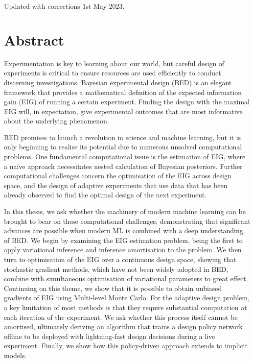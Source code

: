 \documentclass[a4paper, 10pt]{report}
\theoremstyle{plain}
\begin{document}
	
	
	
	\newpage
	Updated with corrections 1st May 2023.
	
	\newpage
	\chapter*{Abstract}
	Experimentation is key to learning about our world, but careful design of experiments is critical to ensure resources are used efficiently to conduct discerning investigations. Bayesian experimental design (BED) is an elegant framework that provides a mathematical definition of the expected information gain (EIG) of running a certain experiment. Finding the design with the maximal EIG will, in expectation, give experimental outcomes that are most informative about the underlying phenomenon.
	
	BED promises to launch a revolution in science and machine learning, but it is only beginning to realise its potential due to numerous unsolved computational problems. One fundamental computational issue is the estimation of EIG, where a naïve approach necessitates nested calculation of Bayesian posteriors. Further computational challenges concern the optimisation of the EIG across design space, and the design of adaptive experiments that use data that has been already observed to find the optimal design of the next experiment.
	
	In this thesis, we ask whether the machinery of modern machine learning can be brought to bear on these computational challenges, demonstrating that significant advances are possible when modern ML is combined with a deep understanding of BED. We begin by examining the EIG estimation problem, being the first to apply variational inference and inference amortisation to the problem. We then turn to optimisation of the EIG over a continuous design space, showing that stochastic gradient methods, which have not been widely adopted in BED, combine with simultaneous optimisation of variational parameters to great effect. Continuing on this theme, we show that it is possible to obtain unbiased gradients of EIG using Multi-level Monte Carlo. For the adaptive design problem, a key limitation of most methods is that they require substantial computation at each iteration of the experiment. We ask whether this process itself cannot be amortised, ultimately deriving an algorithm that trains a design policy network offline to be deployed with lightning-fast design decisions during a live experiment. Finally, we show how this policy-driven approach extends to implicit models.
	
\end{document}
